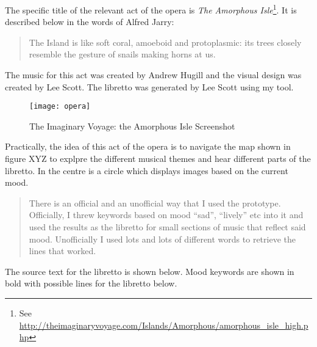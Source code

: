 The specific title of the relevant act of the opera is \emph{The Amorphous Isle}\footnote{See \url{http://theimaginaryvoyage.com/Islands/Amorphous/amorphous_isle_high.php}}. It is described below in the words of Alfred Jarry:

\begin{quotation}
  The Island is like soft coral, amoeboid and protoplasmic: its trees closely resemble the gesture of snails making horns at us.
\end{quotation}

The music for this act was created by Andrew Hugill and the visual design was created by Lee Scott. The libretto was generated by Lee Scott using my tool.

\begin{figure}[!htbp]
  \centering
  \texttt{[image: opera]}
\caption[Imaginary Voyage: Amorphous Isle]{The Imaginary Voyage: the Amorphous Isle Screenshot}
\label{fig:opera}
\end{figure}

Practically, the idea of this act of the opera is to navigate the map shown in figure XYZ to explpre the different musical themes and hear different parts of the libretto. In the centre is a circle which displays images based on the current mood.

\begin{quotation}
  There is an official and an unofficial way that I used the prototype. Officially, I threw keywords based on mood ``sad'', ``lively'' etc into it and used the results as the libretto for small sections of music that reflect said mood. Unofficially I used lots and lots of different words to retrieve the lines that worked. 
\end{quotation}

\spirals

The source text for the libretto is shown below. Mood keywords are shown in bold with possible lines for the libretto below.

